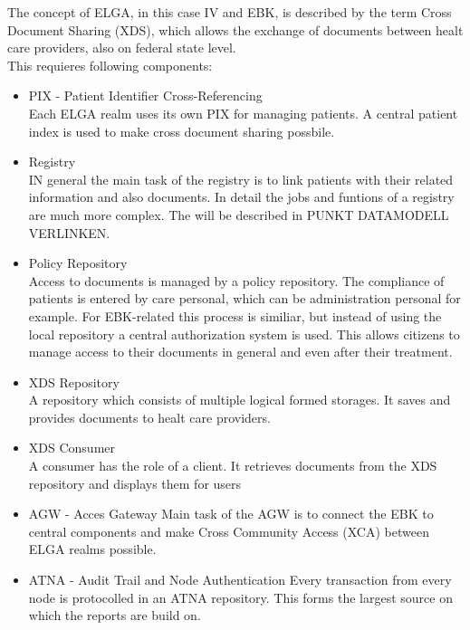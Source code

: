 \documentclass[a4paper]{article}
\begin{document}
	The concept of ELGA, in this case IV and EBK, is described by the term Cross Document Sharing
	(XDS), which allows the exchange of documents between healt care providers, also on federal state level.\\
	This requieres following components:\\
	\begin{itemize}
	    	\item PIX - Patient Identifier Cross-Referencing\\
	    	Each ELGA realm uses its own PIX for managing patients. A central patient index is used to
	    	make cross document sharing possbile.
	    	\item Registry\\
	    	IN general the main task of the registry is to link patients with their related information and also documents.
	    	In detail the jobs and funtions of a registry are much more complex. The will be described in PUNKT DATAMODELL VERLINKEN.
	    	\item Policy Repository\\
	    	Access to documents is managed  by a policy repository. The compliance of patients is entered
	    	by care personal, which can be administration personal for example. For EBK-related this process is similiar, but instead
	    	of using the local repository a central authorization system is used. This allows citizens to manage access to their documents
	    	in general and even after their treatment.
	    	\item XDS Repository\\
	    	A repository which consists of multiple logical formed storages. It saves and provides documents
	    	to healt care providers.
	    	\item XDS Consumer\\
	    	A consumer has the role of a client. It retrieves documents from the XDS repository and displays them for users 
	    	\item AGW - Acces Gateway
	    	Main task of the AGW is to connect the EBK to central components and make Cross Community Access (XCA) between
	    	ELGA realms possible.
	    	\item ATNA - Audit Trail and Node Authentication
	    	Every transaction from every node is protocolled in an ATNA repository.
	    	This forms the largest source on which the reports are build on.
	    	
	 \end{itemize}
	
\end{document}
